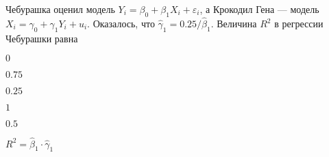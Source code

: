 
\begin{question}
Чебурашка оценил модель \(Y_i = \beta_0 + \beta_1 X_i + \varepsilon_i\),
а Крокодил Гена --- модель \(X_i = \gamma_0 + \gamma_1 Y_i + u_i\).
Оказалось, что \(\hat\gamma_1 = 0.25/\hat\beta_1\). Величина \(R^2\) в
регрессии Чебурашки равна
\begin{answerlist}
  \item \(0\)
  \item \(0.75\)
  \item \(0.25\)
  \item \(1\)
  \item \(0.5\)
\end{answerlist}
\end{question}

\begin{solution}
\(R^2 = \hat\beta_1 \cdot \hat\gamma_1\)
\end{solution}

